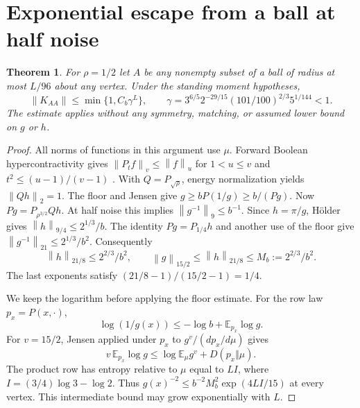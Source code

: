 \documentclass[11pt]{article}
\newtheorem{theorem}{Theorem}[section]
\newcommand{\E}{\mathbb E}
\newcommand{\norm}[1]{\left\lVert#1\right\rVert}
\begin{document}
\section{Exponential escape from a ball at half noise}
\begin{theorem}\label{escape}
For $\rho=1/2$ let $A$ be any nonempty subset of a ball of radius at most $L/96$ about any vertex. Under the standing moment hypotheses,
\[
 \norm{K_{AA}}\le \min\{1,C_b\gamma^L\},\qquad
 \gamma=3^{6/5}2^{-29/15}(101/100)^{2/3}5^{1/144}<1.
\]
The estimate applies without any symmetry, matching, or assumed lower bound on $g$ or $h$.
\end{theorem}

\begin{proof}
All norms of functions in this argument use $\mu$. Forward Boolean hypercontractivity gives $\norm{P_t f}_v\le\norm f_u$ for $1<u\le v$ and $t^2\le(u-1)/(v-1)$ \cite{bonami,od}. With $Q=P_{\sqrt{\rho}}$, energy normalization yields $\norm{Qh}_2=1$. The floor and Jensen give $g\ge bP(1/g)\ge b/(Pg)$. Now $Pg=P_{\rho^{3/2}}Qh$. At half noise this implies $\norm{g^{-1}}_9\le b^{-1}$. Since $h=\pi/g$, H\"older gives $\norm h_{9/4}\le2^{1/3}/b$. The identity $Pg=P_{1/4}h$ and another use of the floor give $\norm{g^{-1}}_{21}\le2^{1/3}/b^2$. Consequently
\[
 \norm h_{21/8}\le 2^{2/3}/b^2,\qquad
 \norm g_{15/2}\le \norm h_{21/8}\le M_b:=2^{2/3}/b^2 .
\]
The last exponents satisfy $(21/8-1)/(15/2-1)=1/4$.

We keep the logarithm before applying the floor estimate. For the row law $p_x=P(x,\cdot)$,
\[
 \log(1/g(x))\le -\log b + \E_{p_x}\log g .
\]
For $v=15/2$, Jensen applied under $p_x$ to $g^v/(dp_x/d\mu)$ gives
\[
 v\,\E_{p_x}\log g\le\log\E_\mu g^v+D(p_x\Vert\mu).
\]
The product row has entropy relative to $\mu$ equal to $LI$, where $I=(3/4)\log3-\log2$. Thus $g(x)^{-2}\le b^{-2}M_b^2\exp(4LI/15)$ at every vertex. This intermediate bound may grow exponentially with $L$.


\end{proof}
\end{document}
